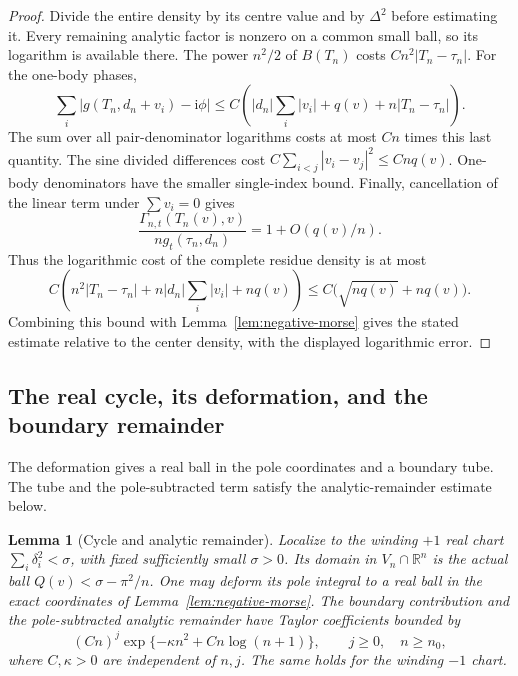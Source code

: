\documentclass[11pt]{article}
\numberwithin{equation}{section}
\newtheorem{lemma}[theorem]{Lemma}
\theoremstyle{definition}
\newcommand{\R}{\mathbb R}
\newcommand{\ii}{\mathrm i}
\begin{document}
\begin{proof}
Divide the entire density by its centre value and by $\Delta^2$ before
estimating it.  Every remaining analytic factor is nonzero on a common
small ball, so its logarithm is available there.  The power $n^2/2$
of $B(T_n)$ costs $Cn^2|T_n-\tau_n|$.  For the one-body phases,
\[
 \sum_i|g(T_n,d_n+v_i)-\ii\phi|
 \le C\left(|d_n|\sum_i|v_i|+q(v)+n|T_n-\tau_n|\right).
\]
The sum over all pair-denominator logarithms costs at most $Cn$ times
this last quantity.  The sine divided differences cost
$C\sum_{i<j}|v_i-v_j|^2\le Cnq(v)$.  One-body denominators have the
smaller single-index bound.  Finally, cancellation of the linear term
under $\sum v_i=0$ gives
\[
 \frac{\Gamma_{n,t}(T_n(v),v)}{n g_t(\tau_n,d_n)}
 =1+O(q(v)/n).
\]
Thus the logarithmic cost of the complete residue density is at most
\[
 C\left(n^2|T_n-\tau_n|+n|d_n|\sum_i|v_i|+nq(v)\right)
 \le C\bigl(\sqrt{nq(v)}+nq(v)\bigr).
\]
Combining this bound with Lemma~\ref{lem:negative-morse} gives the
stated estimate relative to the center density, with the displayed
logarithmic error.
\end{proof}

\subsection{The real cycle, its deformation, and the boundary remainder}

The deformation gives a real ball in the pole coordinates and a
boundary tube. The tube and the pole-subtracted term satisfy the
analytic-remainder estimate below.

\begin{lemma}[Cycle and analytic remainder]
\label{lem:morse-cycle-remainder}
Localize to the winding $+1$ real chart
$\sum_i\delta_i^2<\sigma$, with fixed sufficiently small $\sigma>0$.
Its domain in $V_n\cap\R^n$ is the actual ball
$Q(v)<\sigma-\pi^2/n$.  One may deform its pole integral to a real
ball in the exact coordinates of Lemma~\ref{lem:negative-morse}.
The boundary contribution and the pole-subtracted analytic remainder
have Taylor coefficients bounded by
\begin{equation}
 (C n)^j\exp\{-\kappa n^2+C n\log(n+1)\},
 \qquad j\ge0,\quad n\ge n_0,
 \label{eq:morse-boundary-remainder}
\end{equation}
where $C,\kappa>0$ are independent of $n,j$.  The same holds for
the winding $-1$ chart.
\end{lemma}
\end{document}
